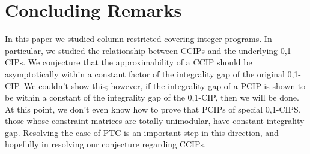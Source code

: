 \documentclass[11pt]{article}
\newcommand{\1}{\mathbb{1}}
\begin{document}
\section{Concluding Remarks}

In this paper we studied column restricted covering integer
programs. In particular, we studied the relationship between CCIPs and
the underlying 0,1-CIPs. We conjecture that the approximability of a
CCIP should be asymptotically within a constant factor of the
integrality gap of the original 0,1-CIP. We couldn't show this;
however, if the integrality gap of a PCIP is shown to be within a
constant of the integrality gap of the 0,1-CIP, then we will be
done. At this point, we don't even know how to prove that PCIPs of
special 0,1-CIPS, those whose constraint matrices are totally
unimodular, have constant integrality gap. Resolving the case of PTC
is an important step in this direction, and hopefully in resolving our
conjecture regarding CCIPs.



\end{document}
